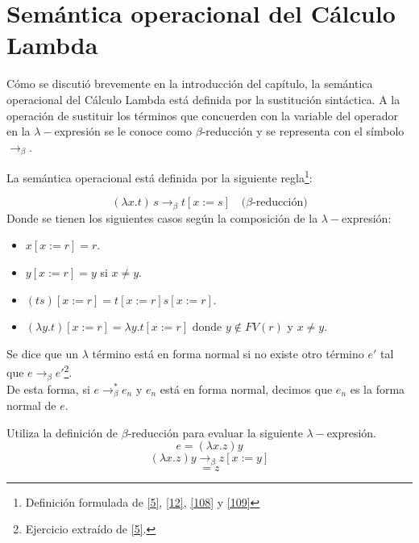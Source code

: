     \section{Semántica operacional del Cálculo Lambda}
    Cómo se discutió brevemente en la introducción del capítulo, la semántica operacional del Cálculo Lambda está definida por la sustitución sintáctica. 
A la operación de sustituir los términos que concuerden con la variable del operador en la $\lambda-$expresión se le conoce como $\beta$-reducción y se representa con el símbolo $\to_\beta$. 


    \begin{definition} La semántica operacional está definida por la siguiente regla\footnote{Definición formulada de \hyperlink{5}{[5]},  \hyperlink{12}{[12]},  \hyperlink{108}{[108]} y  \hyperlink{109}{[109]}}: 

    $$(\lambda x.t)\,s \to_\beta t[x:=s] \quad \text{($\beta$-reducción)}$$
    Donde se tienen los siguientes casos según la composición de la $\lambda-$expresión:\\
        \begin{itemize}
        \item $x[x:=r] = r$. 
        \item $y[x:=r] = y$ si $x\neq y$.
        \item $(ts)[x:=r] = t[x:=r]s[x:=r]$.
        \item $(\lambda y.t)[x:=r] = \lambda y.t[x:=r]$ donde $y\notin FV(r)$ y $x \neq y$.
        \end{itemize}
	\bigskip
    \end{definition}

	    \begin{definition} Se dice que un $\lambda$ término está en forma normal si no existe otro término $e'$ tal que $e\to_\beta e'$\footnote{Ejercicio extraído de \hyperlink{5}{[5]}.}.\\

    De esta forma, si $e\to_\beta^*e_n$ y $e_n$ está en forma normal, decimos que $e_n$ es la forma normal de $e$. 
    \end{definition}    

    \begin{exercise}
    Utiliza la definición de $\beta$-reducción para evaluar la siguiente $\lambda-$expresión.
    $$e= (\lambda x.z)y$$
    \[ (\lambda x.z)y \rightarrow_\beta  z [x := y]\]
    \[ = z \]
    \end{exercise}

